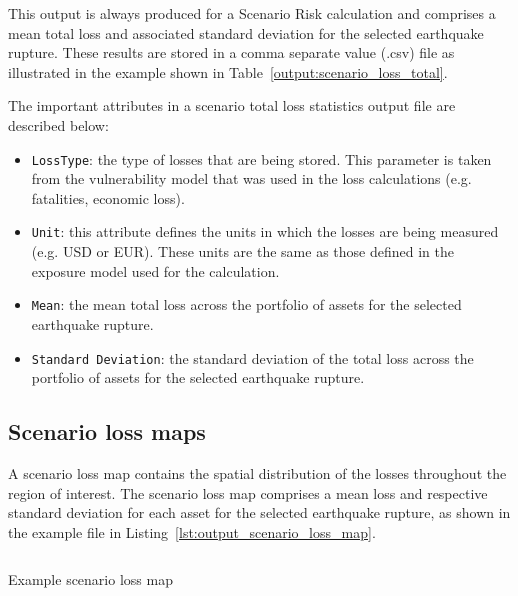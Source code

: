 This output is always produced for a Scenario Risk calculation and comprises a
mean total loss and associated standard deviation for the selected earthquake
rupture. These results are stored in a comma separate value (.csv) file as
illustrated in the example shown in Table~\ref{output:scenario_loss_total}.



The important attributes in a scenario total loss statistics output file are
described below:


\begin{itemize}

  \item \Verb+LossType+: the type of losses that are being stored. This
    parameter is taken from the \gls{vulnerability model} that was used in the
    loss calculations (e.g. fatalities, economic loss).

  \item \Verb+Unit+: this attribute defines the units in which the losses are
    being measured (e.g. USD or EUR). These units are the same as those defined
    in the \gls{exposure model} used for the calculation.

  \item \Verb+Mean+: the mean total loss across the portfolio of assets for the
    selected earthquake rupture.

  \item \Verb+Standard Deviation+: the standard deviation of the total loss 
    across the portfolio of assets for the selected earthquake rupture.

\end{itemize}


\subsection{Scenario loss maps}
\label{subsec:scenario_loss_map}

A scenario loss map contains the spatial distribution of the losses throughout
the region of interest. The scenario loss map comprises a mean loss and
respective standard deviation for each \gls{asset} for the selected earthquake
rupture, as shown in the example file in Listing~\ref{lst:output_scenario_loss_map}.

\begin{listing}[htbp]
  \inputminted[firstline=1,firstnumber=1,fontsize=\footnotesize,frame=single,bgcolor=lightgray]{xml}{oqum/risk/verbatim/output_scenario_loss_map.xml}
  \caption{Example scenario loss map}
  \label{lst:output_scenario_loss_map}
\end{listing}

